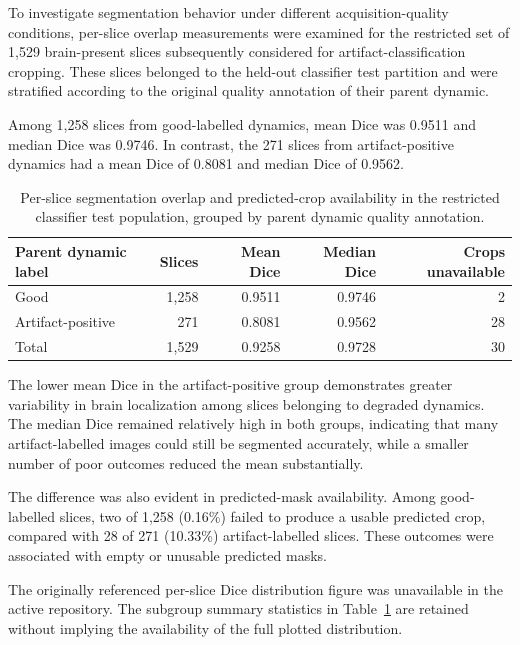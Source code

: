 To investigate segmentation behavior under different acquisition-quality conditions, per-slice overlap measurements were examined for the restricted set of 1,529 brain-present slices subsequently considered for artifact-classification cropping. These slices belonged to the held-out classifier test partition and were stratified according to the original quality annotation of their parent dynamic.

Among 1,258 slices from good-labelled dynamics, mean Dice was 0.9511 and median Dice was 0.9746. In contrast, the 271 slices from artifact-positive dynamics had a mean Dice of 0.8081 and median Dice of 0.9562.

\begin{table}[htbp]
\centering
\caption{Per-slice segmentation overlap and predicted-crop availability in the restricted classifier test population, grouped by parent dynamic quality annotation.}
\label{tab:2d_segmentation_label_subgroups}
\begin{tabular}{lrrrr}
\hline
Parent dynamic label & Slices & Mean Dice & Median Dice & Crops unavailable \\
\hline
Good & 1,258 & 0.9511 & 0.9746 & 2 \\
Artifact-positive & 271 & 0.8081 & 0.9562 & 28 \\
\hline
Total & 1,529 & 0.9258 & 0.9728 & 30 \\
\hline
\end{tabular}
\end{table}

The lower mean Dice in the artifact-positive group demonstrates greater variability in brain localization among slices belonging to degraded dynamics. The median Dice remained relatively high in both groups, indicating that many artifact-labelled images could still be segmented accurately, while a smaller number of poor outcomes reduced the mean substantially.

The difference was also evident in predicted-mask availability. Among good-labelled slices, two of 1,258 (0.16\%) failed to produce a usable predicted crop, compared with 28 of 271 (10.33\%) artifact-labelled slices. These outcomes were associated with empty or unusable predicted masks.

The originally referenced per-slice Dice distribution figure was unavailable in the active repository. The subgroup summary statistics in Table~\ref{tab:2d_segmentation_label_subgroups} are retained without implying the availability of the full plotted distribution.

